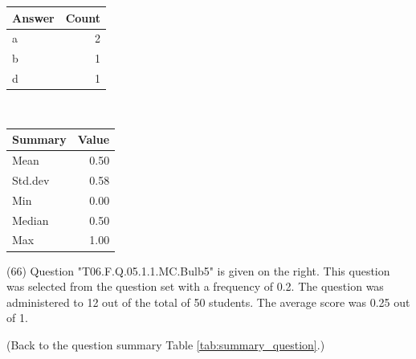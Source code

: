 \documentclass[12pt,english,nohyper]{tufte-handout}\usepackage[]{graphicx}\usepackage[]{color}
\begin{document}
\begin{center}%
\begin{tabular}{lr}
  \hline
Answer & Count \\ 
  \hline
a &   2 \\ 
  b &   1 \\ 
  d &   1 \\ 
   \hline
\end{tabular}
~~~~~~~~%
\begin{tabular}{lr}
  \hline
Summary & Value \\ 
  \hline
Mean & 0.50 \\ 
  Std.dev & 0.58 \\ 
  Min & 0.00 \\ 
  Median & 0.50 \\ 
  Max & 1.00 \\ 
   \hline
\end{tabular}
\end{center}\newpage{} (66) Question "T06.F.Q.05.1.1.MC.Bulb5" is given on the right. This question was selected from the question set with a frequency of 0.2. The question was administered to 12 out of the total of 50 students. The average score was 0.25 out of 1.

 (Back to the question summary Table \ref{tab:summary_question}.)
\end{document}
